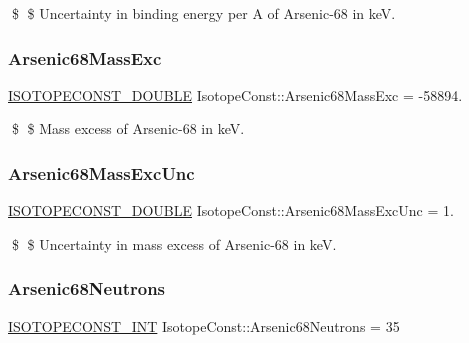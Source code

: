 \$ \$ Uncertainty in binding energy per A of Arsenic-\/68 in keV. \mbox{\label{group___isotope_const-_arsenic-_as68_ga8773edf60f71493fca3f80d2cede893c}} 
\subsubsection{\texorpdfstring{Arsenic68\+Mass\+Exc}{Arsenic68MassExc}}
{\footnotesize\ttfamily \mbox{\hyperlink{group___isotope_const-_macros_ga8f45a7272ce02c0b4c65c44636ed719a}{I\+S\+O\+T\+O\+P\+E\+C\+O\+N\+S\+T\+\_\+\+D\+O\+U\+B\+LE}} Isotope\+Const\+::\+Arsenic68\+Mass\+Exc = -\/58894.}

\$ \$ Mass excess of Arsenic-\/68 in keV. \mbox{\label{group___isotope_const-_arsenic-_as68_ga180154a3e5801212b254e560f151684c}} 
\subsubsection{\texorpdfstring{Arsenic68\+Mass\+Exc\+Unc}{Arsenic68MassExcUnc}}
{\footnotesize\ttfamily \mbox{\hyperlink{group___isotope_const-_macros_ga8f45a7272ce02c0b4c65c44636ed719a}{I\+S\+O\+T\+O\+P\+E\+C\+O\+N\+S\+T\+\_\+\+D\+O\+U\+B\+LE}} Isotope\+Const\+::\+Arsenic68\+Mass\+Exc\+Unc = 1.}

\$ \$ Uncertainty in mass excess of Arsenic-\/68 in keV. \mbox{\label{group___isotope_const-_arsenic-_as68_ga85ba055499c6dfe2100d8955f6395410}} 
\subsubsection{\texorpdfstring{Arsenic68\+Neutrons}{Arsenic68Neutrons}}
{\footnotesize\ttfamily \mbox{\hyperlink{group___isotope_const-_macros_ga5f18360b3e99483a35c32d789e62621c}{I\+S\+O\+T\+O\+P\+E\+C\+O\+N\+S\+T\+\_\+\+I\+NT}} Isotope\+Const\+::\+Arsenic68\+Neutrons = 35}

